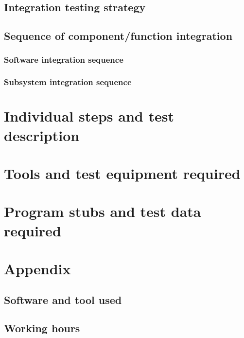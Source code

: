 \documentclass[]{report}
\begin{document}
	\section{Integration testing strategy}
	

	\section{Sequence of component/function integration}
	
	
		\subsection{Software integration sequence}
		
	
		\subsection{Subsystem integration sequence}
		

\chapter{Individual steps and test description}


\chapter{Tools and test equipment required}


\chapter{Program stubs and test data required}


\appendix

\chapter{Appendix}

	\section{Software and tool used}
	

	\section{Working hours}
	
\end{document}
